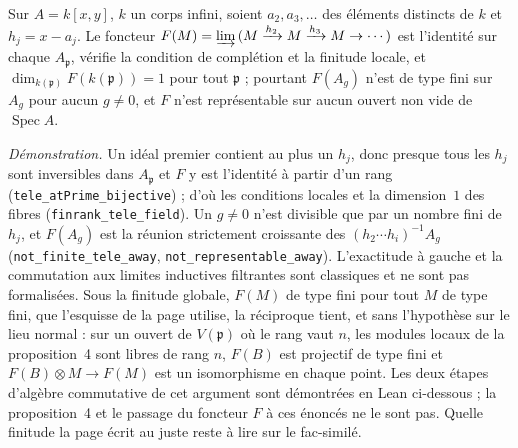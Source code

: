 \begin{encadre}
\begin{contrexemple}
Sur $A = k[x, y]$, $k$ un corps infini, soient $a_2, a_3, \dots$ des éléments distincts de $k$ et $h_j = x - a_j$. Le foncteur $F(M) = \varinjlim\,(M \xrightarrow{h_2} M \xrightarrow{h_3} M \to \cdots)$ est l'identité sur chaque $A_{\mathfrak p}$, vérifie la condition de complétion et la finitude locale, et $\dim_{k(\mathfrak p)} F(k(\mathfrak p)) = 1$ pour tout $\mathfrak p$ ; pourtant $F(A_g)$ n'est de type fini sur $A_g$ pour aucun $g \neq 0$, et $F$ n'est représentable sur aucun ouvert non vide de $\operatorname{Spec} A$.
\end{contrexemple}
\end{encadre}
{\small \emph{Démonstration.} Un idéal premier contient au plus un $h_j$, donc presque tous les $h_j$ sont inversibles dans $A_{\mathfrak p}$ et $F$ y est l'identité à partir d'un rang (\texttt{tele\_atPrime\_bijective}) ; d'où les conditions locales et la dimension~$1$ des fibres (\texttt{finrank\_tele\_field}). Un $g \neq 0$ n'est divisible que par un nombre fini de $h_j$, et $F(A_g)$ est la réunion strictement croissante des $(h_2 \cdots h_i)^{-1} A_g$ (\texttt{not\_finite\_tele\_away}, \texttt{not\_representable\_away}). L'exactitude à gauche et la commutation aux limites inductives filtrantes sont classiques et ne sont pas formalisées. Sous la finitude globale, $F(M)$ de type fini pour tout $M$ de type fini, que l'esquisse de la page utilise, la réciproque tient, et sans l'hypothèse sur le lieu normal : sur un ouvert de $V(\mathfrak p)$ où le rang vaut $n$, les modules locaux de la proposition~4 sont libres de rang $n$, $F(B)$ est projectif de type fini et $F(B) \otimes M \to F(M)$ est un isomorphisme en chaque point. Les deux étapes d'algèbre commutative de cet argument sont démontrées en Lean ci-dessous ; la proposition~4 et le passage du foncteur $F$ à ces énoncés ne le sont pas. Quelle finitude la page écrit au juste reste à lire sur le fac-similé.\par}

